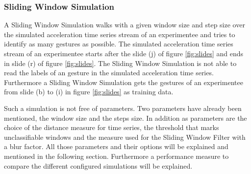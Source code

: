 \subsubsection{Sliding Window Simulation} \label{sliding_window_simulation}
A Sliding Window Simulation walks with a given window size and step size over the simulated acceleration time series
stream of an experimentee and tries to identify as many gestures as possible. The simulated acceleration time series
stream of an experimentee starts after the slide (j) of figure \ref{fig:slides} and ends in slide (r) of figure
\ref{fig:slides}. The Sliding Window Simulation is not able to read the labels of an gesture in the simulated
acceleration time series. Furthermore a Sliding Window Simulation gets the gestures of an experimentee from slide (b)
to (i) in figure \ref{fig:slides} as training data.

Such a simulation is not free of parameters. Two parameters have already been mentioned, the window size and the steps
size. In addition as parameters are the choice of the distance measure for time series, the threshold that marks
unclassifiable windows and the measure used for the Sliding Window Filter with a blur factor. All those parameters and
their options will be explained and mentioned in the following section. Furthermore a performance measure to compare the
different configured simulations will be explained.







